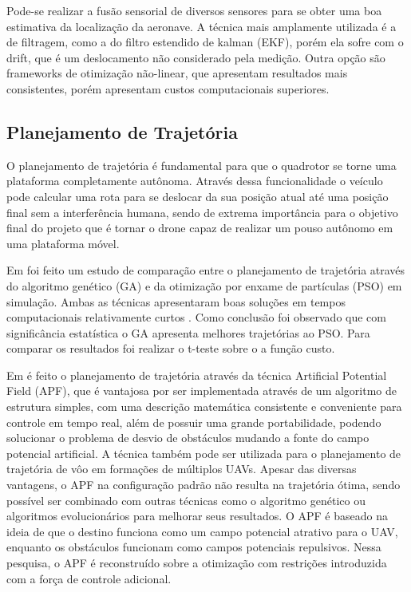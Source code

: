Pode-se realizar a fusão sensorial de diversos sensores para se obter uma boa estimativa da localização da aeronave. A técnica mais amplamente utilizada é a de filtragem, como a do filtro estendido de kalman (EKF), porém ela sofre com o drift, que é um deslocamento não considerado pela medição. Outra opção são frameworks de otimização não-linear, que apresentam resultados mais consistentes, porém apresentam custos computacionais superiores.

\subsection{Planejamento de Trajetória}
O planejamento de trajetória é fundamental para que o quadrotor se torne uma plataforma completamente autônoma. Através dessa funcionalidade o veículo pode calcular uma rota para se deslocar da sua posição atual até uma posição final sem a interferência humana, sendo de extrema importância para o objetivo final do projeto que é tornar o drone capaz de realizar um pouso autônomo em uma plataforma móvel.


Em \cite{Roberge2013b} foi feito um estudo de comparação entre o planejamento de trajetória através do algoritmo genético (GA) e da otimização por enxame de partículas (PSO) em simulação. Ambas as técnicas apresentaram boas soluções em tempos computacionais relativamente curtos . Como conclusão foi observado que com significância estatística o GA apresenta melhores trajetórias ao PSO. Para comparar os resultados foi realizar o t-teste sobre o a função custo.

Em \cite{chen2016uav} é feito o planejamento de trajetória através da técnica Artificial Potential Field (APF), que é vantajosa por ser implementada através de um algoritmo de estrutura simples, com uma descrição matemática consistente e conveniente para controle em tempo real, além de possuir uma grande portabilidade, podendo solucionar o problema de desvio de obstáculos mudando a fonte do campo potencial artificial. A técnica também pode ser utilizada para o planejamento de trajetória de vôo em formações de múltiplos UAVs. Apesar das diversas vantagens, o APF na configuração padrão não resulta na trajetória ótima, sendo possível ser combinado com outras técnicas como o algoritmo genético ou algoritmos evolucionários para melhorar seus resultados. O APF é baseado na ideia de que o destino funciona como um campo potencial atrativo para o UAV, enquanto os obstáculos funcionam como campos potenciais repulsivos. Nessa pesquisa, o APF é reconstruído sobre a otimização com restrições introduzida com a força de controle adicional.

